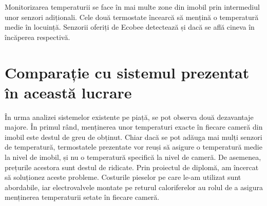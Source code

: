 	Monitorizarea temperaturii se face în mai multe zone din imobil prin intermediul unor senzori adiționali. Cele două termostate încearcă să mențină o temperatură medie în locuință. Senzorii oferiți de Ecobee detectează și dacă se află cineva în încăperea respectivă. 

\section{Comparație cu sistemul prezentat în această lucrare}

	În urma analizei sistemelor existente pe piață, se pot observa două dezavantaje majore. În primul rând, menținerea unor temperaturi exacte în fiecare cameră din imobil este destul de greu de obținut. Chiar dacă se pot adăuga mai mulți senzori de temperatură, termostatele prezentate vor reuși să asigure o temperatură medie la nivel de imobil, și nu o temperatură specifică la nivel de cameră. De asemenea, prețurile acestora sunt destul de ridicate. Prin proiectul de diplomă, am încercat să soluționez aceste probleme. Costurile pieselor pe care le-am utilizat sunt abordabile, iar electrovalvele montate pe returul caloriferelor au rolul de a asigura menținerea temperaturii setate în fiecare cameră.
